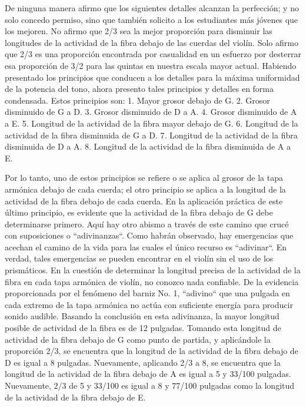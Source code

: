 \documentclass[12pt]{book}
\begin{document}
De ninguna manera afirmo que los siguientes detalles alcanzan la perfección; y no solo concedo permiso, sino que también solicito a los estudiantes más jóvenes que los mejoren. No afirmo que 2/3 sea la mejor proporción para disminuir las longitudes de la actividad de la fibra debajo de las cuerdas del violín. Solo afirmo que 2/3 es una proporción encontrada por casualidad en un esfuerzo por desterrar esa proporción de 3/2 para las quintas en nuestra escala mayor actual. Habiendo presentado los principios que conducen a los detalles para la máxima uniformidad de la potencia del tono, ahora presento tales principios y detalles en forma condensada. Estos principios son: 1. Mayor grosor debajo de G. 2. Grosor disminuido de G a D. 3. Grosor disminuido de D a A. 4. Grosor disminuido de A a E. 5. Longitud de la actividad de la fibra mayor debajo de G. 6. Longitud de la actividad de la fibra disminuida de G a D. 7. Longitud de la actividad de la fibra disminuida de D a A. 8. Longitud de la actividad de la fibra disminuida de A a E.

Por lo tanto, uno de estos principios se refiere o se aplica al grosor de la tapa armónica debajo de cada cuerda; el otro principio se aplica a la longitud de la actividad de la fibra debajo de cada cuerda. En la aplicación práctica de este último principio, es evidente que la actividad de la fibra debajo de G debe determinarse primero. Aquí hay otro abismo a través de este camino que crucé con suposiciones o ``adivinanzas``. Como habrán observado, hay emergencias que acechan el camino de la vida para las cuales el único recurso es ``adivinar``. En verdad, tales emergencias se pueden encontrar en el violín sin el uso de los prismáticos. En la cuestión de determinar la longitud precisa de la actividad de la fibra en cada tapa armónica de violín, no conozco nada confiable. De la evidencia proporcionada por el fenómeno del barniz No. 1, ``adivino`` que una pulgada en cada extremo de la tapa armónica no actúa con suficiente energía para producir sonido audible. Basando la conclusión en esta adivinanza, la mayor longitud posible de actividad de la fibra es de 12 pulgadas. Tomando esta longitud de actividad de la fibra debajo de G como punto de partida, y aplicándole la proporción 2/3, se encuentra que la longitud de la actividad de la fibra debajo de D es igual a 8 pulgadas. Nuevamente, aplicando 2/3 a 8, se encuentra que la longitud de la actividad de la fibra debajo de A es igual a 5 y 33/100 pulgadas. Nuevamente, 2/3 de 5 y 33/100 es igual a 8 y 77/100 pulgadas como la longitud de la actividad de la fibra debajo de E.
\end{document}
